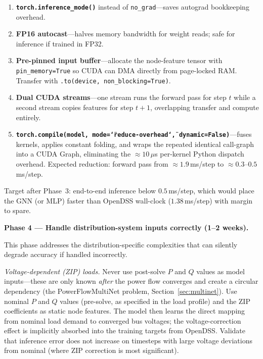 \documentclass[11pt]{article}
\begin{document}
\begin{enumerate}[itemsep=2pt]
  \item \textbf{\texttt{torch.inference\_mode()}} instead of
        \texttt{no\_grad}---saves autograd bookkeeping overhead.
  \item \textbf{FP16 autocast}---halves memory bandwidth for weight reads;
        safe for inference if trained in FP32.
  \item \textbf{Pre-pinned input buffer}---allocate the node-feature tensor
        with \texttt{pin\_memory=True} so CUDA can DMA directly from
        page-locked RAM.  Transfer with
        \texttt{.to(device, non\_blocking=True)}.
  \item \textbf{Dual CUDA streams}---one stream runs the forward pass for
        step $t$ while a second stream copies features for step $t{+}1$,
        overlapping transfer and compute entirely.
  \item \textbf{\texttt{torch.compile(model, mode=\char`\"reduce-overhead\char`\",
        dynamic=False)}}---fuses kernels, applies constant folding, and
        wraps the repeated identical call-graph into a CUDA Graph,
        eliminating the ${\approx}10\,\mu$s per-kernel Python dispatch
        overhead.  Expected reduction: forward pass from
        ${\approx}1.9$\,ms/step to ${\approx}0.3$--$0.5$\,ms/step.
\end{enumerate}

\noindent Target after Phase~3: end-to-end inference below $0.5$\,ms/step,
which would place the GNN (or MLP) faster than OpenDSS wall-clock
($1.38$\,ms/step) with margin to spare.

\medskip
\noindent\textbf{Phase 4 --- Handle distribution-system inputs correctly (1--2 weeks).}

This phase addresses the distribution-specific complexities that can
silently degrade accuracy if handled incorrectly.

\emph{Voltage-dependent (ZIP) loads.}  Never use post-solve $P$ and $Q$
values as model inputs---these are only known \emph{after} the power flow
converges and create a circular dependency (the PowerFlowMultiNet
problem, Section~\ref{sec:multinet}).  Use nominal $P$ and $Q$ values
(pre-solve, as specified in the load profile) and the ZIP coefficients as
static node features.  The model then learns the direct mapping from
nominal load demand to converged bus voltages; the voltage-correction
effect is implicitly absorbed into the training targets from OpenDSS.
Validate that inference error does not increase on timesteps with large
voltage deviations from nominal (where ZIP correction is most significant).
\end{document}
